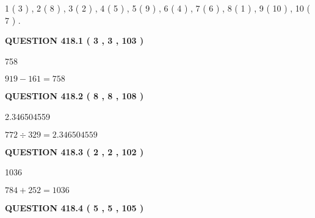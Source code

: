 \documentclass{ctexart}
\begin{document}
   
   1 ( 3 )
 ,
   2 ( 8 )
 ,
   3 ( 2 )
 ,
   4 ( 5 )
 ,
   5 ( 9 )
 ,
   6 ( 4 )
 ,
   7 ( 6 )
 ,
   8 ( 1 )
 ,
   9 ( 10 )
 ,
   10 ( 7 )
 .
  
\vspace{0.2in}
  
{\textbf{\Large{QUESTION
418.1 
 ( 3 , 3 , 103 )
}}}
  
  
 
 
\noindent{}

758
 
 
 
 
\noindent{}

$ %
919 -  %
161=   %
758$
 
 
  
\vspace{0.2in}
  
{\textbf{\Large{QUESTION
418.2 
 ( 8 , 8 , 108 )
}}}
  
  
 
 
\noindent{}

2.346504559
 
 
 
 
\noindent{}

$ %
772 \div  %
329=   %
2.346504559$
 
 
  
\vspace{0.2in}
  
{\textbf{\Large{QUESTION
418.3 
 ( 2 , 2 , 102 )
}}}
  
  
 
 
\noindent{}

1036
 
 
 
 
\noindent{}

$ %
784 +  %
252=   %
1036$
 
 
  
\vspace{0.2in}
  
{\textbf{\Large{QUESTION
418.4 
 ( 5 , 5 , 105 )
}}}
  
  
 
 
\noindent{}
\end{document}
